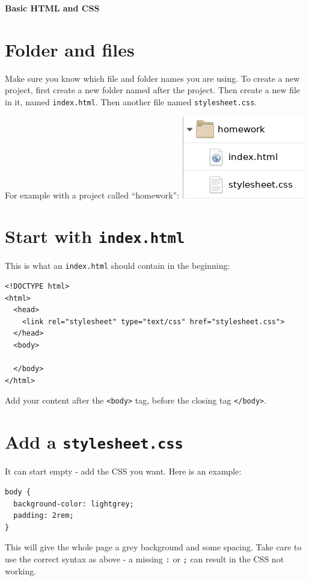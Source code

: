 \documentclass[10pt,a4paper]{article}
\begin{document}
{\textsf
{\textbf
{\huge Basic HTML and CSS }
}
}

\section*{Folder and files}

Make sure you know which file and folder names you are using. To
create a new project, first create a new folder named after the
project. Then create a new file in it, named \lstinline|index.html|.
Then another file named \lstinline|stylesheet.css|.

For example with a project called ``homework'': \includegraphics{project}

\section*{Start with \lstinline|index.html|}

This is what an \lstinline|index.html| should contain in the
beginning:

\begin{lstlisting}
<!DOCTYPE html>
<html>
  <head>
    <link rel="stylesheet" type="text/css" href="stylesheet.css">
  </head>
  <body>

  </body>
</html>
\end{lstlisting}

Add your content after the \lstinline|<body>| tag, before
the closing tag \lstinline|</body>|.

\section*{Add a \lstinline|stylesheet.css|}

It can start empty - add the CSS you want. Here is an example:

\begin{lstlisting}
body {
  background-color: lightgrey;
  padding: 2rem;
}
\end{lstlisting}

This will give the whole page a grey background and some spacing. Take
care to use the correct syntax as above - a missing \lstinline|:| or
\lstinline|;| can result in the CSS not working.
\end{document}
